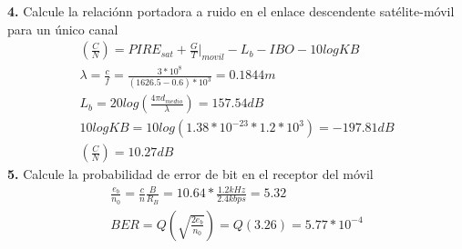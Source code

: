 \begin{exercise}[4]
	\textbf{4.} Calcule la relaciónn portadora a ruido en el enlace descendente satélite-móvil para un único canal\\
	\begin{gather*}
		(\frac{C}{N})=PIRE_{sat}+\frac{G}{T}|_{movil}-L_b-IBO-10logKB\\
		\lambda=\frac{c}{f}=\frac{3*10^8}{(1626.5-0.6)*10^3}=0.1844m\\
		L_b=20log(\frac{4\pi d_{medio}}{\lambda})=157.54dB\\
		10logKB=10log(1.38*10^{-23}*1.2*10^3)=-197.81dB\\
		(\frac{C}{N})=10.27dB
	\end{gather*}
	\textbf{5.} Calcule la probabilidad de error de bit en el receptor del móvil\\
	\begin{gather*}
		\frac{e_b}{n_0}=\frac{c}{n}\frac{B}{R_B}=10.64*\frac{1.2kHz}{2.4kbps}=5.32\\
		BER=Q(\sqrt{\frac{2e_b}{n_0}})=Q(3.26)=5.77*10^{-4}
	\end{gather*}
\end{exercise}
